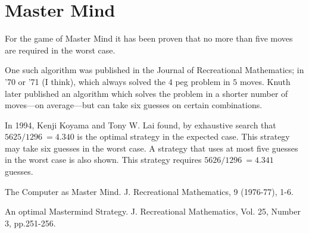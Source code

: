 \section{Master Mind}

    For the game of Master Mind it has been proven that no more than
    five moves are required in the worst case.

    One such algorithm was published in the Journal of Recreational
    Mathematics; in '70 or '71 (I think), which always solved the
    $4$ peg problem in $5$ moves. Knuth later published an algorithm which
    solves the problem in a shorter number of moves---on average---but can
    take six guesses on certain combinations.

    In 1994, Kenji Koyama and Tony W. Lai found, by exhaustive search
    that $5625/1296~=4.340$ is the optimal strategy in the expected
    case. This strategy may take six guesses in the worst case.
    A strategy that uses at most five guesses in the worst case
    is also shown. This strategy requires $5626/1296~=4.341$ guesses.


\Ref

            {The Computer as Master Mind.}
            {J. Recreational Mathematics,}
            { 9 (1976-77), 1-6.}

            {An optimal Mastermind Strategy.}
            {J. Recreational Mathematics,}
            {Vol. 25, Number 3, pp.251-256.}
